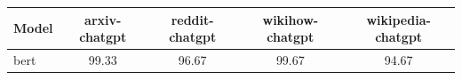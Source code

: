 \begin{tabular}{l|c|c|c|c}
\toprule
Model & arxiv-chatgpt & reddit-chatgpt & wikihow-chatgpt & wikipedia-chatgpt \\
\midrule
bert & 99.33 & 96.67 & 99.67 & 94.67 \\
\bottomrule
\end{tabular}